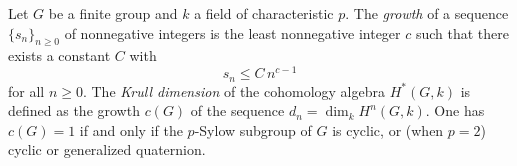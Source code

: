 Let $G$ be a finite group and $k$ a field of characteristic $p$. The {\it growth} of a sequence $\{s_n\}_{n \geq 0}$ of nonnegative integers is the least nonnegative integer $c$ such that there exists a constant $C$ with
\[
s_n \leq C \, n^{c-1}
\]
for all $n \geq 0$. The {\it Krull dimension} of the cohomology algebra $H^*(G, k)$ is defined as the growth $c(G)$ of the sequence $d_n = \dim_k H^n(G, k)$. One has $c(G) = 1$ if and only if the $p$-Sylow subgroup of $G$ is cyclic, or (when $p = 2$) cyclic or generalized quaternion.
